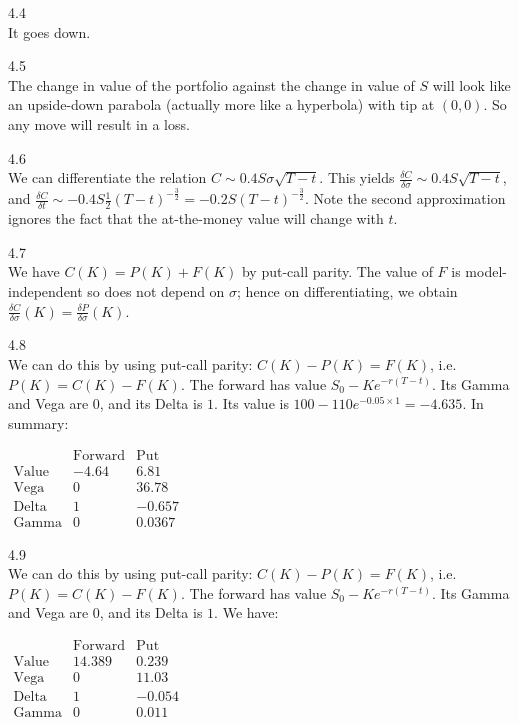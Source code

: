 4.4 \\
It goes down.

4.5 \\
The change in value of the portfolio against the change in value of $S$ will look like an upside-down parabola (actually more like a hyperbola) with tip at $(0,0)$. So any move will result in a loss.

4.6 \\
We can differentiate the relation $C \sim 0.4 S \sigma \sqrt{T-t}$. This yields $\frac{\delta C}{\delta \sigma} \sim 0.4 S \sqrt{T-t}$, and $\frac{\delta C}{\delta t} \sim -0.4 S \frac{1}{2} (T-t)^{-\frac{3}{2}} = -0.2 S (T-t)^{-\frac{3}{2}}$. Note the second approximation ignores the fact that the at-the-money value will change with $t$.

4.7 \\
We have $C(K)=P(K)+F(K)$ by put-call parity. The value of $F$ is model-independent so does not depend on $\sigma$; hence on differentiating, we obtain $\frac{\delta C}{\delta \sigma}(K)=\frac{\delta P}{\delta \sigma}(K)$.

4.8 \\
We can do this by using put-call parity: $C(K)-P(K)=F(K)$, i.e. $P(K)=C(K)-F(K)$. The forward has value $S_0 - K e^{-r(T-t)}$. Its Gamma and Vega are $0$, and its Delta is $1$. Its value is $100-110 e^{-0.05 \times 1}=-4.635$. In summary:

$
\begin{matrix}
\text{ } & \text{Forward} & \text{Put} \\
\text{Value} & -4.64 & 6.81 \\
\text{Vega} & 0 & 36.78 \\
\text{Delta} & 1 & -0.657 \\
\text{Gamma} & 0 & 0.0367
\end{matrix}
$

4.9 \\
We can do this by using put-call parity: $C(K)-P(K)=F(K)$, i.e. $P(K)=C(K)-F(K)$. The forward has value $S_0 - Ke^{-r(T-t)}$. Its Gamma and Vega are $0$, and its Delta is $1$. We have:

$
\begin{matrix}
\text{ } & \text{Forward} & \text{Put} \\
\text{Value} & 14.389 & 0.239 \\
\text{Vega} & 0 & 11.03 \\
\text{Delta} & 1 & -0.054 \\
\text{Gamma} & 0 & 0.011
\end{matrix}
$

